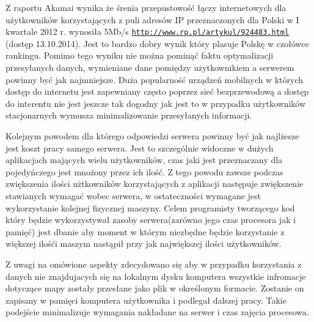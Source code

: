 Z raportu Akamai wynika że śrenia przepustowość łączy internetowych dla użytkowników korzystających z puli adresów IP przeznaczonych dla Polski w I kwartale 2012 r. wynosiła 5Mb/s  \underline{\texttt{http://www.rp.pl/artykul/924483.html}} (dostęp 13.10.2014). Jest to bardzo dobry wynik który plasuje Polskę w czołówce rankingu. Pomimo tego wyniku nie można pominąć faktu optymalizacji przesyłanych danych, wymieniane dane pomiędzy użytkownikiem a serwerem powinny być jak najmniejsze. Duża popularność urządzeń mobilnych w których dostęp do internetu jest zapewniany często poprzez sieć bezprzewodową a dostęp do interentu nie jest jeszcze tak dogodny jak jest to w przypadku użytkowników stacjonarnych  wymusza minimalizowanie przesyłanych informacji.

Kolejnym powodem dla którego odpowiedzi serwera powinny być jak najlżesze jest koszt pracy samego serwera. Jest to szczególnie widoczne w dużych aplikacjach mających wielu użytkowników, czas jaki jest przeznaczany dla pojedyńczego jest mnożony przez ich ilość. Z tego powodu zawsze podczas zwiększenia ilości użtkowników korzystających z aplikacji następuje zwiększenie stawianych wymagać wobec serwera, w ostateczności wymagane jest wykorzystanie kolejnej fizycznej maszyny. Celem programisty tworzącego kod który będzie wykorzystywał zasoby serwera(zarówno jego czas procesora jak i pamięć) jest dbanie aby moment w którym niezbędne będzie korzystanie z większej ilośći maszym nastąpił przy jak największej ilości użytkowników.

Z uwagi na omówione aspekty zdecydowano się aby w przypadku korzystania z danych nie znajdujacych się na lokalnym dysku komputera wszystkie infromacje dotyczące mapy zostały przesłane jako plik w określonym formacie. Zostanie on zapisany w pamięci komputera użytkownika i podlegał dalszej pracy. Takie podejście minimalizuje wymagania nakładane na serwer i czas zajęcia procesowa.

\newpage
